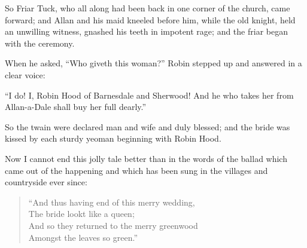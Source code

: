So Friar Tuck, who all along had been back in one corner of the church,
came forward; and Allan and his maid kneeled before him, while the old
knight, held an unwilling witness, gnashed his teeth in impotent rage;
and the friar began with the ceremony.

When he asked, ``Who giveth this woman?'' Robin stepped up and answered
in a clear voice:

``I do! I, Robin Hood of Barnesdale and Sherwood! And he who takes her
from Allan-a-Dale shall buy her full dearly.''

So the twain were declared man and wife and duly blessed; and the bride
was kissed by each sturdy yeoman beginning with Robin Hood.

Now I cannot end this jolly tale better than in the words of the ballad
which came out of the happening and which has been sung in the villages
and countryside ever since:

\begin{quote}
``And thus having end of this merry wedding,\\
The bride lookt like a queen;\\
And so they returned to the merry greenwood\\
Amongst the leaves so green.''
\end{quote}

